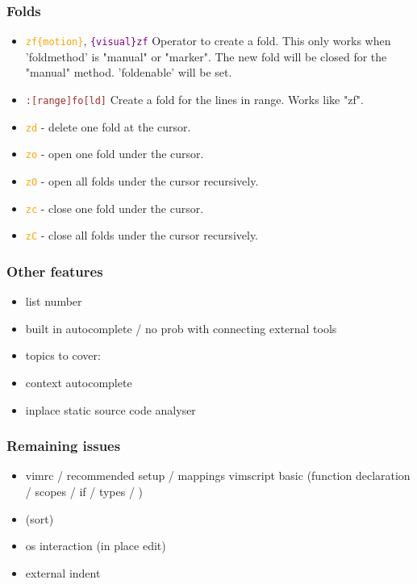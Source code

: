 \documentclass{beamer}
\newcommand{\vimnormal}[1]{\texttt{\textcolor{orange}{#1}}}
\newcommand{\vimcommand}[1]{\texttt{\textcolor{brown}{#1}}}
\newcommand{\vimvisual}[1]{\texttt{\textcolor{purple}{#1}}}
\begin{document}
\begin{frame}
    \frametitle{Folds}
    \begin{itemize}
        \item \vimnormal{zf\{motion\}}, \vimvisual{\{visual\}zf} Operator to create a fold.  This only works when 'foldmethod' is "manual" or "marker".  The new fold will be closed for the "manual" method.  'foldenable' will be set.
        \item \vimcommand{:[range]fo[ld]} Create a fold for the lines in {range}.  Works like "zf".
        \item \vimnormal{zd} - delete one fold at the cursor.
        \item \vimnormal{zo} - open one fold under the cursor.
        \item \vimnormal{zO} - open all folds under the cursor recursively.
        \item \vimnormal{zc} - close one fold under the cursor.
        \item \vimnormal{zC} - close all folds under the cursor recursively.
    \end{itemize}
\end{frame}

\begin{frame}
    \frametitle{Other features}
    \begin{itemize}
        \item list number
        \item built in autocomplete / no prob with connecting external tools
        \item topics to cover:
        \item context autocomplete
        \item inplace static source code analyser
    \end{itemize}
\end{frame}

\begin{frame}
    \frametitle{Remaining issues}
    \begin{itemize}
        \item vimrc / recommended setup / mappings vimscript basic (function declaration / scopes / if / types / )
        \item  (sort)
        \item    os interaction (in place edit)
        \item   external indent
    \end{itemize}
\end{frame}
\end{document}
